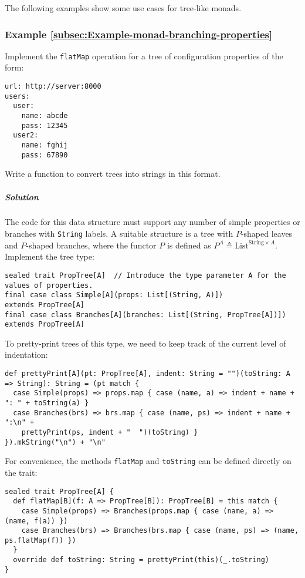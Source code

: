 The following examples show some use cases for tree-like monads.

\subsubsection{Example \label{subsec:Example-monad-branching-properties}\ref{subsec:Example-monad-branching-properties}}

Implement the \lstinline!flatMap! operation for a tree of configuration
properties of the form:
\begin{lstlisting}
url: http://server:8000
users:
  user:
    name: abcde
    pass: 12345
  user2:
    name: fghij
    pass: 67890
\end{lstlisting}
Write a function to convert trees into strings in this format.

\subparagraph{Solution}

The code for this data structure must support any number of simple
properties or branches with \lstinline!String! labels. A suitable
structure is a tree with $P$-shaped leaves and $P$-shaped branches,
where the functor $P$ is defined as $P^{A}\triangleq\text{List}^{\text{String}\times A}$.
Implement the tree type:
\begin{lstlisting}
sealed trait PropTree[A]  // Introduce the type parameter A for the values of properties.
final case class Simple[A](props: List[(String, A)])                  extends PropTree[A]
final case class Branches[A](branches: List[(String, PropTree[A])])   extends PropTree[A]
\end{lstlisting}
To pretty-print trees of this type, we need to keep track of the current
level of indentation:
\begin{lstlisting}
def prettyPrint[A](pt: PropTree[A], indent: String = "")(toString: A => String): String = (pt match {
  case Simple(props) => props.map { case (name, a) => indent + name + ": " + toString(a) }
  case Branches(brs) => brs.map { case (name, ps) => indent + name + ":\n" +
    prettyPrint(ps, indent + "  ")(toString) }
}).mkString("\n") + "\n"
\end{lstlisting}
For convenience, the methods \lstinline!flatMap! and \lstinline!toString!
can be defined directly on the trait:
\begin{lstlisting}
sealed trait PropTree[A] {
  def flatMap[B](f: A => PropTree[B]): PropTree[B] = this match {
    case Simple(props) => Branches(props.map { case (name, a) => (name, f(a)) })
    case Branches(brs) => Branches(brs.map { case (name, ps) => (name, ps.flatMap(f)) })
  }
  override def toString: String = prettyPrint(this)(_.toString)
}
\end{lstlisting}

